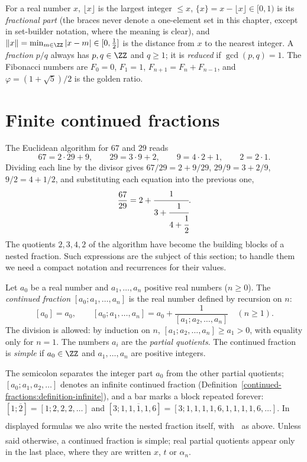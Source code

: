 \begin{notation}\label{continued-fractions:notation-basic}
For a real number $x$, $\lfloor x \rfloor$ is the largest integer $\leq x$, $\{x\} = x - \lfloor x \rfloor \in [0, 1)$ is its \emph{fractional part} (the braces never denote a one-element set in
this chapter, except in set-builder notation, where the meaning is clear), and $\lVert x \rVert = \min_{m \in \ZZ}|x - m| \in [0, \frac12]$ is the distance from $x$ to the nearest integer. A
\emph{fraction} $p/q$ always has $p, q \in \ZZ$ and $q \geq 1$; it is \emph{reduced} if $\gcd(p, q) = 1$. The Fibonacci numbers are $F_0 = 0$, $F_1 = 1$, $F_{n+1} = F_n + F_{n-1}$, and
$\varphi = (1 + \sqrt5)/2$ is the golden ratio.
\end{notation}

\section{Finite continued fractions}\label{continued-fractions:section-finite}

The Euclidean algorithm for $67$ and $29$ reads
\[
67 = 2 \cdot 29 + 9, \qquad 29 = 3 \cdot 9 + 2, \qquad 9 = 4 \cdot 2 + 1, \qquad 2 = 2 \cdot 1.
\]
Dividing each line by the divisor gives $67/29 = 2 + 9/29$, $29/9 = 3 + 2/9$, $9/2 = 4 + 1/2$, and substituting each equation into the previous one,
\[
\frac{67}{29} = 2 + \cfrac{1}{3 + \cfrac{1}{4 + \cfrac{1}{2}}}.
\]
The quotients $2, 3, 4, 2$ of the algorithm have become the building blocks of a nested fraction. Such expressions are the subject of this section; to handle them we need a compact notation and
recurrences for their values.

\begin{definition}\label{continued-fractions:definition-continued-fraction}
Let $a_0$ be a real number and $a_1, \ldots, a_n$ positive real numbers ($n \geq 0$). The \emph{continued fraction} $[a_0; a_1, \ldots, a_n]$ is the real number defined by recursion on $n$:
\[
[a_0] = a_0, \qquad [a_0; a_1, \ldots, a_n] = a_0 + \frac{1}{[a_1; a_2, \ldots, a_n]} \quad (n \geq 1).
\]
The division is allowed: by induction on $n$, $[a_1; a_2, \ldots, a_n] \geq a_1 > 0$, with equality only for $n = 1$. The numbers $a_i$ are the \emph{partial quotients}. The continued fraction is
\emph{simple} if $a_0 \in \ZZ$ and $a_1, \ldots, a_n$ are positive integers.
\end{definition}

\begin{notation}\label{continued-fractions:notation-continued-fraction}
The semicolon separates the integer part $a_0$ from the other partial quotients; $[a_0; a_1, a_2, \ldots]$ denotes an infinite continued fraction
(Definition~\ref{continued-fractions:definition-infinite}), and a bar marks a block repeated forever: $[1; \overline{2}] = [1; 2, 2, 2, \ldots]$ and
$[3; \overline{1, 1, 1, 1, 6}] = [3; 1, 1, 1, 1, 6, 1, 1, 1, 1, 6, \ldots]$. In displayed formulas we also write the nested fraction itself, with $\cfrac{}{}$ as above. Unless said otherwise, a
continued fraction is simple; real partial quotients appear only in the last place, where they are written $x$, $t$ or $\alpha_n$.
\end{notation}

